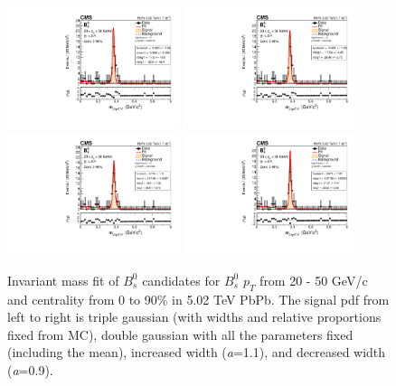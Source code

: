 \begin{figure}[hbtp]
\begin{center}
\includegraphics[width=0.45\textwidth]{Figures/Chapter4/data_PbPb_1_BptNew_2050_doubly0_0_90_signal_3gaussEffInfoTreeFit.pdf}
\includegraphics[width=0.45\textwidth]{Figures/Chapter4/data_PbPb_1_BptNew_2050_doubly0_0_90_signal_fixedEffInfoTreeFit.pdf}
\includegraphics[width=0.45\textwidth]{Figures/Chapter4/data_PbPb_1_BptNew_2050_doubly0_0_90_signal_scal+EffInfoTreeFit.pdf}
\includegraphics[width=0.45\textwidth]{Figures/Chapter4/data_PbPb_1_BptNew_2050_doubly0_0_90_signal_scal-EffInfoTreeFit.pdf}
\caption{Invariant mass fit of $B^0_s$ candidates for $B^0_s$ $p_T$ from 20 - 50 GeV/c and centrality from 0 to 90\% in 5.02 TeV PbPb. The signal pdf from left to right is triple gaussian (with widths and relative proportions fixed from MC), double gaussian with all the parameters fixed (including the mean), increased width (\textit{a}=1.1), and decreased width (\textit{a}=0.9).}
\label{BsSigVar}
\end{center}
\end{figure}


